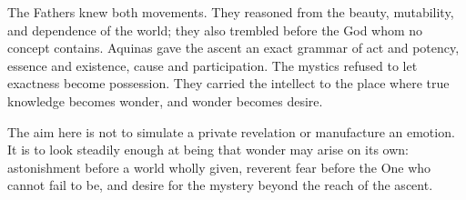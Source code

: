 The Fathers knew both movements. They reasoned from the beauty, mutability, and dependence of the world; they also trembled before the God whom no concept contains. Aquinas gave the ascent an exact grammar of act and potency, essence and existence, cause and participation. The mystics refused to let exactness become possession. They carried the intellect to the place where true knowledge becomes wonder, and wonder becomes desire.

The aim here is not to simulate a private revelation or manufacture an emotion. It is to look steadily enough at being that wonder may arise on its own: astonishment before a world wholly given, reverent fear before the One who cannot fail to be, and desire for the mystery beyond the reach of the ascent.
